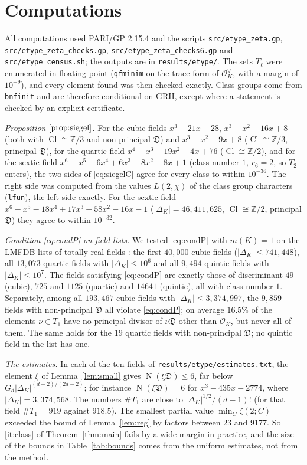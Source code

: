 \documentclass[11pt]{amsart}
\theoremstyle{definition}
\numberwithin{equation}{section}
\DeclareMathOperator{\N}{N}
\DeclareMathOperator{\Cl}{Cl}
\newcommand{\OK}{\mathcal{O}_K}
\newcommand{\OKd}{\mathcal{O}_K^{\vee}}
\newcommand{\Dif}{\mathfrak{D}}
\newcommand{\Z}{\mathbb{Z}}
\newcommand{\file}[1]{\texttt{#1}}
\begin{document}
\section{Computations}\label{sec:computations}

All computations used PARI/GP 2.15.4 and the scripts \file{src/etype\_zeta.gp},
\file{src/etype\_zeta\_checks.gp}, \file{src/etype\_zeta\_checks6.gp} and \file{src/etype\_census.sh};
the outputs are in \file{results/etype/}.  The sets $T_\ell$ were enumerated in floating point
(\file{qfminim} on the trace form of $\OKd$, with a margin of $10^{-9}$), and every element found was
then checked exactly.  Class groups come from \file{bnfinit} and are therefore conditional on GRH,
except where a statement is checked by an explicit certificate.

\medskip\noindent\emph{Proposition $\ref{prop:siegel}$.}  For the cubic fields $x^3-21x-28$,
$x^3-x^2-16x+8$ (both with $\Cl\cong\Z/3$ and non-principal $\Dif$) and $x^3-x^2-9x+8$ ($\Cl\cong\Z/3$,
principal $\Dif$), for the quartic field $x^4-x^3-19x^2+4x+76$ ($\Cl\cong\Z/2$), and for the sextic
field $x^6-x^5-6x^4+6x^3+8x^2-8x+1$ (class number $1$, $r_6=2$, so $T_2$ enters), the two sides of
\eqref{eq:siegelC} agree for every class to within $10^{-36}$.  The right side was computed from the
values $L(2,\chi)$ of the class group characters (\file{lfun}), the left side exactly.  For the
sextic field $x^6-x^5-18x^4+17x^3+58x^2-16x-1$ ($|\Delta_K|=46{,}411{,}625$, $\Cl\cong\Z/2$, principal
$\Dif$) they agree to within $10^{-32}$.

\medskip\noindent\emph{Condition \eqref{eq:condP} on field lists.}  We tested \eqref{eq:condP} with
$m(K)=1$ on the LMFDB lists of totally real fields \cite{LMFDB}: the first $40{,}000$ cubic fields
($|\Delta_K|\le741{,}448$), all $13{,}073$ quartic fields with $|\Delta_K|\le10^6$ and all $9{,}494$
quintic fields with $|\Delta_K|\le10^7$.  The fields satisfying \eqref{eq:condP} are exactly those of
discriminant $49$ (cubic), $725$ and $1125$ (quartic) and $14641$ (quintic), all with class number $1$.
Separately, among all $193{,}467$ cubic fields with $|\Delta_K|\le3{,}374{,}997$, the $9{,}859$
fields with non-principal $\Dif$ all violate \eqref{eq:condP}; on average $16.5\%$ of the elements
$\nu\in T_1$ have no principal divisor of $\nu\Dif$ other than $\OK$, but never all of them.  The same
holds for the $19$ quartic fields with non-principal $\Dif$; no quintic field in the list has one.

\medskip\noindent\emph{The estimates.}  In each of the ten fields of \file{results/etype/estimates.txt}, the element $\xi$ of
Lemma~\ref{lem:small} gives $\N(\xi\Dif)\le6$, far below $G_d|\Delta_K|^{(d-2)/(2d-2)}$; for instance
$\N(\xi\Dif)=6$ for $x^3-435x-2774$, where $|\Delta_K|=3{,}374{,}568$.  The numbers $\#T_1$ are close
to $|\Delta_K|^{1/2}/(d-1)!$ (for that field $\#T_1=919$ against $918.5$).  The smallest partial value
$\min_C\zeta(2;C)$ exceeded the bound of Lemma~\ref{lem:reg} by factors between $23$ and $9177$.  So
\ref{it:class} of Theorem~\ref{thm:main} fails by a wide margin in practice, and the size of the
bounds in Table~\ref{tab:bounds} comes from the uniform estimates, not from the method.
\end{document}
